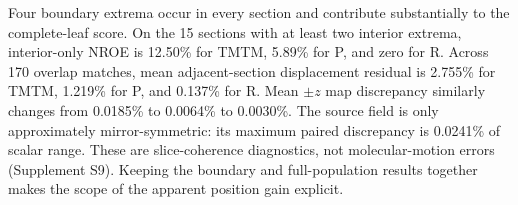 Four boundary extrema occur in every section and contribute substantially to the complete-leaf score. On the 15 sections with at least two interior extrema, interior-only NROE is 12.50\% for TMTM, 5.89\% for P, and zero for R. Across 170 overlap matches, mean adjacent-section displacement residual is 2.755\% for TMTM, 1.219\% for P, and 0.137\% for R. Mean $\pm z$ map discrepancy similarly changes from 0.0185\% to 0.0064\% to 0.0030\%. The source field is only approximately mirror-symmetric: its maximum paired discrepancy is 0.0241\% of scalar range. These are slice-coherence diagnostics, not molecular-motion errors (Supplement S9). Keeping the boundary and full-population results together makes the scope of the apparent position gain explicit.

